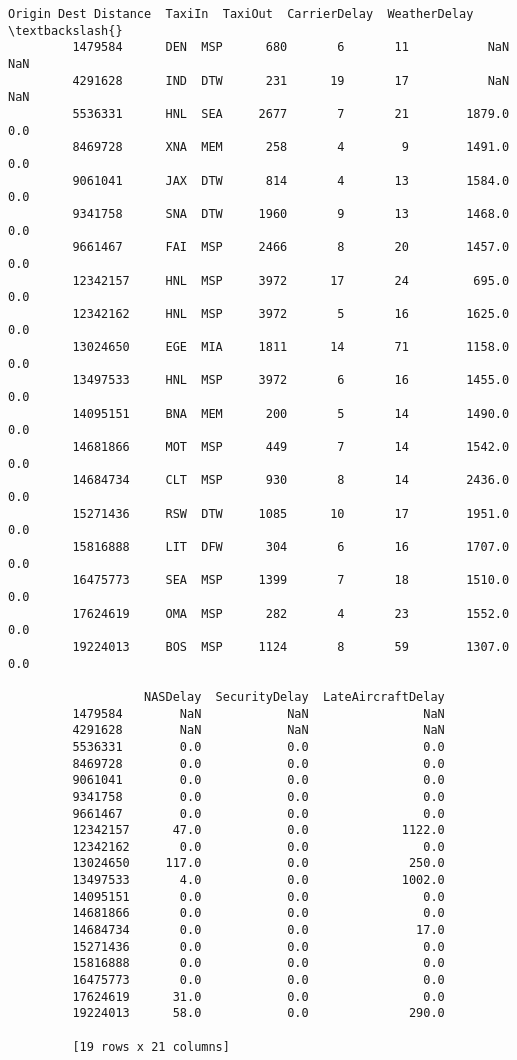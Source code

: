 \documentclass[11pt]{article}
\begin{document}
\begin{Verbatim}[commandchars=\\\{\}]
                   Origin Dest Distance  TaxiIn  TaxiOut  CarrierDelay  WeatherDelay  \textbackslash{}
         1479584      DEN  MSP      680       6       11           NaN           NaN   
         4291628      IND  DTW      231      19       17           NaN           NaN   
         5536331      HNL  SEA     2677       7       21        1879.0           0.0   
         8469728      XNA  MEM      258       4        9        1491.0           0.0   
         9061041      JAX  DTW      814       4       13        1584.0           0.0   
         9341758      SNA  DTW     1960       9       13        1468.0           0.0   
         9661467      FAI  MSP     2466       8       20        1457.0           0.0   
         12342157     HNL  MSP     3972      17       24         695.0           0.0   
         12342162     HNL  MSP     3972       5       16        1625.0           0.0   
         13024650     EGE  MIA     1811      14       71        1158.0           0.0   
         13497533     HNL  MSP     3972       6       16        1455.0           0.0   
         14095151     BNA  MEM      200       5       14        1490.0           0.0   
         14681866     MOT  MSP      449       7       14        1542.0           0.0   
         14684734     CLT  MSP      930       8       14        2436.0           0.0   
         15271436     RSW  DTW     1085      10       17        1951.0           0.0   
         15816888     LIT  DFW      304       6       16        1707.0           0.0   
         16475773     SEA  MSP     1399       7       18        1510.0           0.0   
         17624619     OMA  MSP      282       4       23        1552.0           0.0   
         19224013     BOS  MSP     1124       8       59        1307.0           0.0   
         
                   NASDelay  SecurityDelay  LateAircraftDelay  
         1479584        NaN            NaN                NaN  
         4291628        NaN            NaN                NaN  
         5536331        0.0            0.0                0.0  
         8469728        0.0            0.0                0.0  
         9061041        0.0            0.0                0.0  
         9341758        0.0            0.0                0.0  
         9661467        0.0            0.0                0.0  
         12342157      47.0            0.0             1122.0  
         12342162       0.0            0.0                0.0  
         13024650     117.0            0.0              250.0  
         13497533       4.0            0.0             1002.0  
         14095151       0.0            0.0                0.0  
         14681866       0.0            0.0                0.0  
         14684734       0.0            0.0               17.0  
         15271436       0.0            0.0                0.0  
         15816888       0.0            0.0                0.0  
         16475773       0.0            0.0                0.0  
         17624619      31.0            0.0                0.0  
         19224013      58.0            0.0              290.0  
         
         [19 rows x 21 columns]
\end{Verbatim}
            
\end{document}
